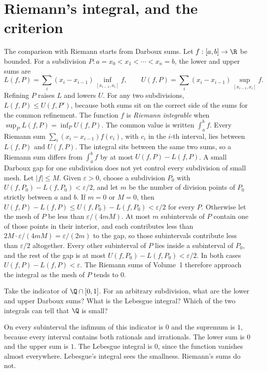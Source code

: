 \section{Riemann's integral, and the criterion}

The comparison with Riemann starts from Darboux sums. Let \(f:[a,b]\to\R\) be bounded. For a subdivision \(P:a=x_0<x_1<\cdots<x_n=b\), the lower and upper sums are
\[L(f,P)=\sum_i(x_i-x_{i-1})\inf_{[x_{i-1},x_i]}f,\qquad U(f,P)=\sum_i(x_i-x_{i-1})\sup_{[x_{i-1},x_i]}f.\]
Refining \(P\) raises \(L\) and lowers \(U\). For any two subdivisions, \(L(f,P)\le U(f,P')\), because both sums sit on the correct side of the sums for the common refinement. The function \(f\) is \emph{Riemann integrable} when \(\sup_PL(f,P)=\inf_PU(f,P)\). The common value is written \(\int_a^bf\). Every Riemann sum \(\sum_i(x_i-x_{i-1})f(c_i)\), with \(c_i\) in the \(i\)-th interval, lies between \(L(f,P)\) and \(U(f,P)\). The integral sits between the same two sums, so a Riemann sum differs from \(\int_a^bf\) by at most \(U(f,P)-L(f,P)\). A small Darboux gap for one subdivision does not yet control every subdivision of small mesh. Let \(|f|\le M\). Given \(\varepsilon>0\), choose a subdivision \(P_0\) with \(U(f,P_0)-L(f,P_0)<\varepsilon/2\), and let \(m\) be the number of division points of \(P_0\) strictly between \(a\) and \(b\). If \(m=0\) or \(M=0\), then \(U(f,P)-L(f,P)\le U(f,P_0)-L(f,P_0)<\varepsilon/2\) for every \(P\). Otherwise let the mesh of \(P\) be less than \(\varepsilon/(4mM)\). At most \(m\) subintervals of \(P\) contain one of those points in their interior, and each contributes less than \(2M\cdot\varepsilon/(4mM)=\varepsilon/(2m)\) to the gap, so those subintervals contribute less than \(\varepsilon/2\) altogether. Every other subinterval of \(P\) lies inside a subinterval of \(P_0\), and the rest of the gap is at most \(U(f,P_0)-L(f,P_0)<\varepsilon/2\). In both cases \(U(f,P)-L(f,P)<\varepsilon\). The Riemann sums of Volume~1 therefore approach the integral as the mesh of \(P\) tends to \(0\).

\begin{think}
Take the indicator of \(\Q\cap[0,1]\). For an arbitrary subdivision, what are the lower and upper Darboux sums? What is the Lebesgue integral? Which of the two integrals can tell that \(\Q\) is small?
\end{think}

On every subinterval the infimum of this indicator is \(0\) and the supremum is \(1\), because every interval contains both rationals and irrationals. The lower sum is \(0\) and the upper sum is \(1\). The Lebesgue integral is \(0\), since the function vanishes almost everywhere. Lebesgue's integral sees the smallness. Riemann's sums do not.

